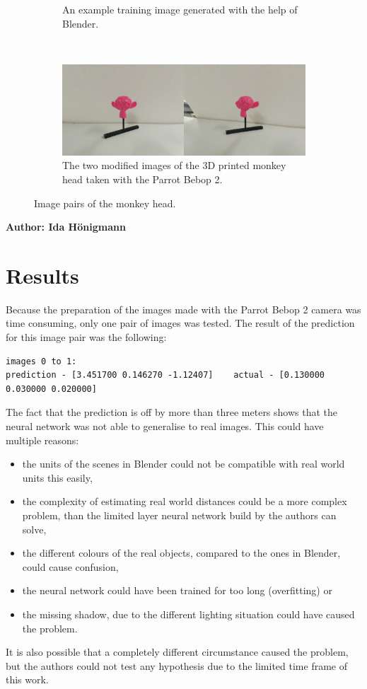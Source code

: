 \begin{figure}[h!]
\begin{subfigure}[t]{\textwidth}
		\caption{An example training image generated with the help of Blender.}
	\end{subfigure}
	~ 
	\begin{subfigure}[t]{\textwidth}
		\centering
		\includegraphics[width=\textwidth]{img/experiment2_environment_comparison_1.jpg}
		\caption{The two modified images of the 3D printed monkey head taken with the Parrot Bebop 2.}
	\end{subfigure}
	\caption{Image pairs of the monkey head.}
	\label{pic:experiment2_environment_comparison}
\end{figure}

\vspace{5mm}
\noindent
\textbf{Author: Ida Hönigmann}

\section{Results}
Because the preparation of the images made with the Parrot Bebop 2 camera was time consuming, only one pair of images was tested. The result of the prediction for this image pair was the following:

\begin{lstlisting}[]
images 0 to 1:
prediction - [3.451700 0.146270 -1.12407]    actual - [0.130000 0.030000 0.020000]
\end{lstlisting}

The fact that the prediction is off by more than three meters shows that the neural network was not able to generalise to real images. This could have multiple reasons:

\begin{itemize}
	\item the units of the scenes in Blender could not be compatible with real world units this easily,
	\item the complexity of estimating real world distances could be a more complex problem, than the limited layer neural network build by the authors can solve,
	\item the different colours of the real objects, compared to the ones in Blender, could cause confusion,
	\item the neural network could have been trained for too long (overfitting) or
	\item the missing shadow, due to the different lighting situation could have caused the problem.
\end{itemize}

It is also possible that a completely different circumstance caused the problem, but the authors could not test any hypothesis due to the limited time frame of this work.

\filbreak